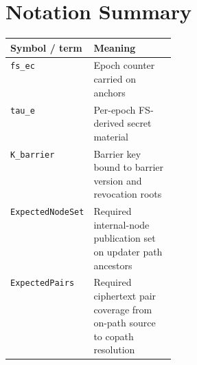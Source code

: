 \documentclass[11pt]{article}
\begin{document}
\section{Notation Summary}
\begin{tabularx}{\linewidth}{>{\raggedright\arraybackslash}p{0.28\linewidth} X}
\toprule
Symbol / term & Meaning \\
\midrule
\texttt{fs\_ec} & Epoch counter carried on anchors \\
\texttt{tau\_e} & Per-epoch FS-derived secret material \\
\texttt{K\_barrier} & Barrier key bound to barrier version and revocation roots \\
\texttt{ExpectedNodeSet} & Required internal-node publication set on updater path ancestors \\
\texttt{ExpectedPairs} & Required ciphertext pair coverage from on-path source to copath resolution \\
\bottomrule
\end{tabularx}



\end{document}

